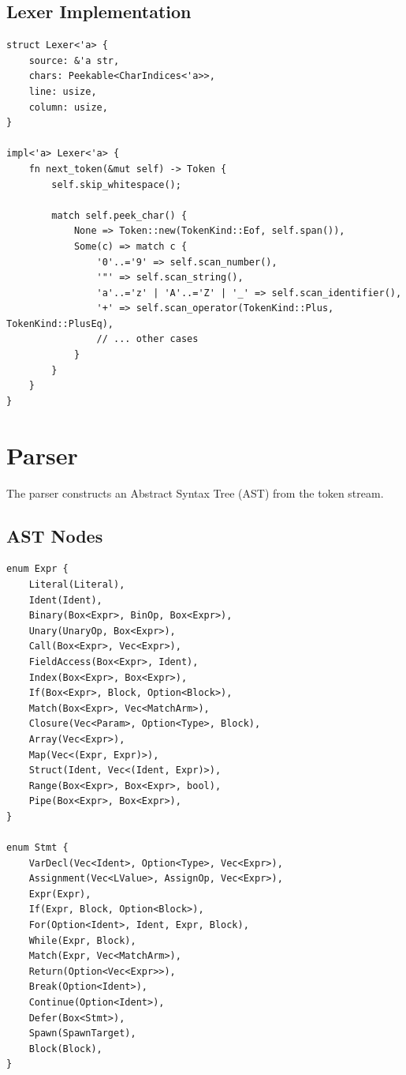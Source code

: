 \subsection{Lexer Implementation}

\begin{lstlisting}[language={}]
struct Lexer<'a> {
    source: &'a str,
    chars: Peekable<CharIndices<'a>>,
    line: usize,
    column: usize,
}

impl<'a> Lexer<'a> {
    fn next_token(&mut self) -> Token {
        self.skip_whitespace();

        match self.peek_char() {
            None => Token::new(TokenKind::Eof, self.span()),
            Some(c) => match c {
                '0'..='9' => self.scan_number(),
                '"' => self.scan_string(),
                'a'..='z' | 'A'..='Z' | '_' => self.scan_identifier(),
                '+' => self.scan_operator(TokenKind::Plus, TokenKind::PlusEq),
                // ... other cases
            }
        }
    }
}
\end{lstlisting}

\section{Parser}

The parser constructs an Abstract Syntax Tree (AST) from the token stream.

\subsection{AST Nodes}

\begin{lstlisting}[language={}]
enum Expr {
    Literal(Literal),
    Ident(Ident),
    Binary(Box<Expr>, BinOp, Box<Expr>),
    Unary(UnaryOp, Box<Expr>),
    Call(Box<Expr>, Vec<Expr>),
    FieldAccess(Box<Expr>, Ident),
    Index(Box<Expr>, Box<Expr>),
    If(Box<Expr>, Block, Option<Block>),
    Match(Box<Expr>, Vec<MatchArm>),
    Closure(Vec<Param>, Option<Type>, Block),
    Array(Vec<Expr>),
    Map(Vec<(Expr, Expr)>),
    Struct(Ident, Vec<(Ident, Expr)>),
    Range(Box<Expr>, Box<Expr>, bool),
    Pipe(Box<Expr>, Box<Expr>),
}

enum Stmt {
    VarDecl(Vec<Ident>, Option<Type>, Vec<Expr>),
    Assignment(Vec<LValue>, AssignOp, Vec<Expr>),
    Expr(Expr),
    If(Expr, Block, Option<Block>),
    For(Option<Ident>, Ident, Expr, Block),
    While(Expr, Block),
    Match(Expr, Vec<MatchArm>),
    Return(Option<Vec<Expr>>),
    Break(Option<Ident>),
    Continue(Option<Ident>),
    Defer(Box<Stmt>),
    Spawn(SpawnTarget),
    Block(Block),
}
\end{lstlisting}

